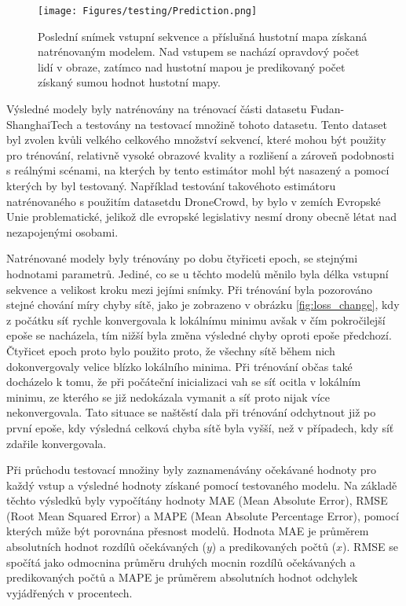 \begin{figure}[h!]
	\centering
	\texttt{[image: Figures/testing/Prediction.png]}
	\caption{Poslední snímek vstupní sekvence a příslušná hustotní mapa získaná natrénovaným modelem. Nad vstupem se nachází opravdový počet lidí v obraze, zatímco nad hustotní mapou je predikovaný počet získaný sumou hodnot hustotní mapy.}
	\label{fig:Prediction example}
\end{figure}

Výsledné modely byly natrénovány na trénovací části datasetu Fudan-ShanghaiTech a testovány na testovací množině tohoto datasetu.
Tento dataset byl zvolen kvůli velkého celkového množství sekvencí, které mohou být použity pro trénování, relativně vysoké obrazové kvality a rozlišení a zároveň podobnosti s reálnými scénami, na kterých by tento estimátor mohl být nasazený a pomocí kterých by byl testovaný.
Například testování takovéhoto estimátoru natrénovaného s použitím datasetdu DroneCrowd, by bylo v zemích Evropské Unie problematické, jelikož dle evropské legislativy nesmí drony obecně létat nad nezapojenými osobami. \cite{drones_over_people}

Natrénované modely byly trénovány po dobu čtyřiceti epoch, se stejnými hodnotami parametrů.
Jediné, co se u těchto modelů měnilo byla délka vstupní sekvence a velikost kroku mezi jejími snímky.
Při trénování byla pozorováno stejné chování míry chyby sítě, jako je zobrazeno v obrázku \ref{fig:loss_change}, kdy z počátku síť rychle konvergovala k lokálnímu minimu avšak v čím pokročilejší epoše se nacházela, tím nižší byla změna výsledné chyby oproti epoše předchozí.
Čtyřicet epoch proto bylo použito proto, že všechny sítě během nich dokonvergovaly velice blízko lokálního minima.
Při trénování občas také docházelo k tomu, že při počáteční inicializaci vah se síť ocitla v lokálním minimu, ze kterého se již nedokázala vymanit a síť proto nijak více nekonvergovala.
Tato situace se naštěstí dala při trénování odchytnout již po první epoše, kdy výsledná celková chyba sítě byla vyšší, než v případech, kdy síť zdařile konvergovala.

Při průchodu testovací množiny byly zaznamenávány očekávané hodnoty pro každý vstup a výsledné hodnoty získané pomocí testovaného modelu.
Na základě těchto výsledků byly vypočítány hodnoty MAE (Mean Absolute Error), RMSE (Root Mean Squared Error) a MAPE (Mean Absolute Percentage Error), pomocí kterých může být porovnána přesnost modelů.
Hodnota MAE je průměrem absolutních hodnot rozdílů očekávaných (\(y\)) a predikovaných počtů (\(x\)).
RMSE se spočítá jako odmocnina průměru druhých mocnin rozdílů očekávaných a predikovaných počtů a MAPE je průměrem absolutních hodnot odchylek vyjádřených v procentech.


